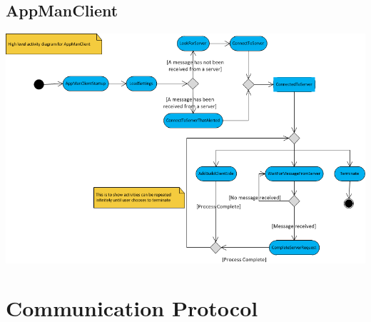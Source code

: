\documentclass[a4paper,12pt,final]{article}
\begin{document}
\subsection{AppManClient}
\begin{center}
\includegraphics[angle = 90, scale=1]{SlaveMainActivity.png}
\end{center}



\newpage
\section{Communication Protocol}
\end{document}
